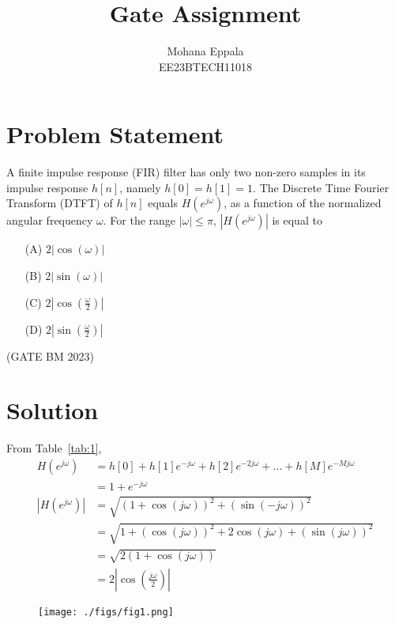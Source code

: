 \documentclass[12pt]{article}
\newcommand{\tabref}[1]{Table~\ref{#1}}
\providecommand{\abs}[1]{\left\vert#1\right\vert}
\begin{document}
\title{Gate Assignment}
\author{Mohana Eppala\\ EE23BTECH11018}
\maketitle

\section*{Problem Statement}
A finite impulse response (FIR) filter has only two non-zero samples in its impulse response $h[n]$, namely $h[0] = h[1] = 1$. The Discrete Time Fourier Transform (DTFT) of $h[n]$ equals $H(e^{j\omega})$, as a function of the normalized angular frequency $\omega$. For the range $\abs{\omega} \leq \pi$, $\abs{H(e^{j\omega})}$ is equal to
\begin{enumerate}
	\item[(A)] $2\abs{\cos(\omega)}$
	\item[(B)] $2\abs{\sin(\omega)}$
	\item[(C)] $2\abs{\cos(\frac{\omega}{2})}$
	\item[(D)] $2\abs{\sin(\frac{\omega}{2})}$
\end{enumerate}
\hfill(GATE BM 2023)


\section*{Solution}
\begin{table}[H]
	
\end{table}
From \tabref{tab:1},
\begin{align}
	H(e^{j\omega}) &= h[0] + h[1]e^{-j\omega} + h[2]e^{-2j\omega} +...+h[M]e^{-Mj\omega} \\
	&= 1 + e^{-j\omega} \\
	\abs{H(e^{j\omega})} &= \sqrt{(1+\cos{(j\omega)})^{2} + (\sin{(-j\omega)})^{2}} \\
	&= \sqrt{1+(\cos{(j\omega)})^{2}+2\cos{(j\omega)}+(\sin{(j\omega)})^{2}} \\
	&= \sqrt{2(1+\cos{(j\omega)})} \\
	&= 2\abs{\cos{(\frac{j\omega}{2})}}
\end{align}
\begin{figure}[h]
	\centering
	\texttt{[image: ./figs/fig1.png]}
\end{figure}
\end{document}
